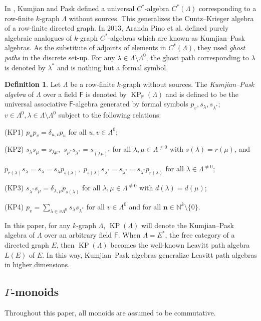 \documentclass[a4paper,reqno,12pt]{amsart}
\numberwithin{equation}{section}
\theoremstyle{definition}
\newtheorem{dfn}[thm]{Definition}
\theoremstyle{remark}
\newcommand{\KP}{\operatorname{KP}}
\newcommand{\N}{\mathbf{n}}
\begin{document}
In \cite{KumjianPask}, Kumjian and Pask defined a universal $C^*$-algebra $C^*(\Lambda)$ corresponding to a row-finite $k$-graph $\Lambda$ without sources. This generalizes the Cuntz--Krieger algebra of a row-finite directed graph. In 2013, Aranda Pino et al. \cite{Pino} defined purely algebraic analogues of $k$-graph $C^*$-algebras which are known as Kumjian--Pask algebras. As the substitute of adjoints of elements in $C^*(\Lambda)$, they used \emph{ghost paths} in the discrete set-up. For any $\lambda\in \Lambda\setminus \Lambda^0$, the ghost path corresponding to $\lambda$ is denoted by $\lambda^*$ and is nothing but a formal symbol. 
\begin{dfn}\label{def KP algebra}
Let $\Lambda$ be a row-finite $k$-graph without sources. The \emph{Kumjian--Pask algebra} of $\Lambda$ over a field $\mathsf{F}$ is denoted by $\KP_\mathsf{F}(\Lambda)$ and is defined to be the universal associative $\mathsf{F}$-algebra generated by formal symbols $p_v,s_\lambda,s_{\lambda^*}$; $v\in \Lambda^0,\lambda\in \Lambda\setminus \Lambda^0$ subject to the following relations:

(KP1) $p_up_v=\delta_{u,v}p_u$ for all $u,v\in \Lambda^0$;

(KP2) $s_\lambda s_\mu=s_{\lambda\mu},$ $s_{\mu^*}s_{\lambda^*}=s_{(\lambda\mu)^*}$ for all $\lambda,\mu\in \Lambda^{\neq 0}$ with $s(\lambda)=r(\mu)$, and

$p_{r(\lambda)}s_\lambda=s_\lambda=s_\lambda p_{s(\lambda)},$ $p_{s(\lambda)}s_{\lambda^*}=s_{\lambda^*}=s_{\lambda^*}p_{r(\lambda)}$ for all $\lambda\in \Lambda^{\neq 0}$;

(KP3) $s_{\lambda^*} s_\mu=\delta_{\lambda,\mu}p_{s(\lambda)}$ for all $\lambda,\mu\in \Lambda^{\neq 0}$ with $d(\lambda)=d(\mu)$;

(KP4) $p_v=\displaystyle{\sum_{\lambda\in v\Lambda^\N}} s_\lambda s_{\lambda^*}$ for all $v\in \Lambda^0$ and for all $\N\in \mathbb{N}^k\setminus \{0\}$.
\end{dfn}

In this paper, for any $k$-graph $\Lambda$, $\KP(\Lambda)$ will denote the Kumjian--Pask algebra of $\Lambda$ over an arbitrary field $\mathsf{F}$. When $\Lambda=E^*$, the free category of a directed graph $E$, then $\KP(\Lambda)$ becomes the well-known Leavitt path algebra $L(E)$ of $E$. In this way, Kumjian--Pask algebras generalize Leavitt path algebras in higher dimensions. 

\subsection{$\Gamma$-monoids} 
Throughout this paper, all monoids are assumed to be commutative. 
\end{document}
